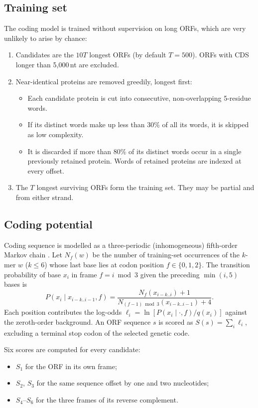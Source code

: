 \subsection{Training set}
The coding model is trained without supervision on long ORFs, which are very unlikely to arise by
chance:
\begin{enumerate}
  \item Candidates are the $10T$ longest ORFs (by default $T=500$). ORFs with CDS longer than 5{,}000\,nt
        are excluded.
  \item Near-identical proteins are removed greedily, longest first:
        \begin{itemize}
          \item Each candidate protein is cut into consecutive, non-overlapping 5-residue words.
          \item If its distinct words make up less than 30\% of all its words, it is skipped as low
                complexity.
          \item It is discarded if more than 80\% of its distinct words occur in a single
                previously retained protein. Words of retained proteins are indexed at every offset.
        \end{itemize}
  \item The $T$ longest surviving ORFs form the training set. They may be partial and from either
        strand.
\end{enumerate}

\subsection{Coding potential}
Coding sequence is modelled as a three-periodic (inhomogeneous) fifth-order Markov chain
\citep{Borodovsky1993,Parra2000}. Let $N_f(w)$ be the number of training-set occurrences of the
$k$-mer $w$ ($k\le 6$) whose last base lies at codon position $f\in\{0,1,2\}$. The transition
probability of base $x_i$ in frame $f=i \bmod 3$ given the preceding $\min(i,5)$ bases is
\begin{equation}
  P(x_i \mid x_{i-k..i-1}, f) = \frac{N_f(x_{i-k..i}) + 1}{N_{(f-1)\bmod 3}(x_{i-k..i-1}) + 4}.
\end{equation}
Each position contributes the log-odds $\ell_i=\ln\!\left[P(x_i\mid\cdot,f)/q(x_i)\right]$ against the
zeroth-order background. An ORF sequence $s$ is scored as $S(s)=\sum_i \ell_i$, excluding a
terminal stop codon of the selected genetic code.

Six scores are computed for every candidate:
\begin{itemize}
  \item $S_1$ for the ORF in its own frame;
  \item $S_2$, $S_3$ for the same sequence offset by one and two nucleotides;
  \item $S_4$--$S_6$ for the three frames of its reverse complement.
\end{itemize}

